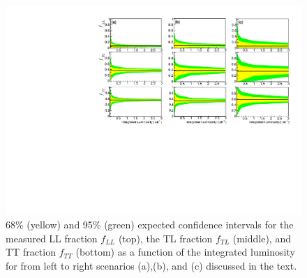 \documentclass[aps,prl,twocolumn,showpacs,superscriptaddress,groupeaddress,floatfix]{revtex4}
\begin{document}
\begin{figure}[h]
\includegraphics[width=.9\textwidth]{fig_04.pdf}
\caption{ \label{fig:sensitivity} 68\% (yellow) and 95\% (green) expected confidence intervals for the measured LL fraction $f_{LL}$ (top), the TL fraction $f_{TL}$ (middle), and TT fraction $f_{TT}$ (bottom) as a function of the integrated luminosity for from left to right scenarios (a),(b), and (c) discussed in the text.}
\end{figure}

\clearpage

\end{document}

